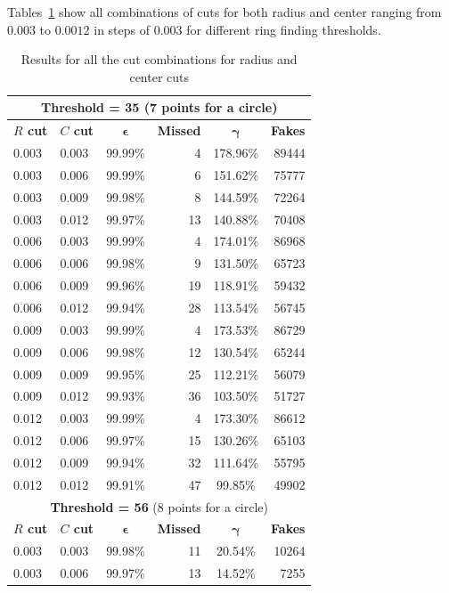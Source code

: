 \documentclass[11pt]{scrreprt}
\begin{document}
Tables~\ref{tab:longtable} show all combinations of cuts for both radius and center ranging from $0.003$ to
$0.0012$ in steps of $0.003$ for different ring finding thresholds. 
\newpage
\begin{longtable}{llcrcr}
\caption{Results for all the cut combinations for radius and center cuts}\label{tab:longtable}\\
\toprule
\multicolumn{6}{c}{\textbf{Threshold = 35} (7 points for a circle)}\\
\midrule
\textbf{$R$ cut} & \textbf{$C$ cut} & $\boldsymbol{\epsilon}$ & \textbf{Missed} & $\boldsymbol{\gamma}$ & \textbf{Fakes} \\
\midrule
0.003 & 0.003 & 99.99\% & 4 & 178.96\% & 89444 \\
0.003 & 0.006 & 99.99\% & 6 & 151.62\% & 75777 \\
0.003 & 0.009 & 99.98\% & 8 & 144.59\% & 72264 \\
0.003 & 0.012 & 99.97\% & 13 & 140.88\% & 70408 \\
0.006 & 0.003 & 99.99\% & 4 & 174.01\% & 86968 \\
0.006 & 0.006 & 99.98\% & 9 & 131.50\% & 65723 \\
0.006 & 0.009 & 99.96\% & 19 & 118.91\% & 59432 \\
0.006 & 0.012 & 99.94\% & 28 & 113.54\% & 56745 \\
0.009 & 0.003 & 99.99\% & 4 & 173.53\% & 86729 \\
0.009 & 0.006 & 99.98\% & 12 & 130.54\% & 65244 \\
0.009 & 0.009 & 99.95\% & 25 & 112.21\% & 56079 \\
0.009 & 0.012 & 99.93\% & 36 & 103.50\% & 51727 \\
0.012 & 0.003 & 99.99\% & 4 & 173.30\% & 86612 \\
0.012 & 0.006 & 99.97\% & 15 & 130.26\% & 65103 \\
0.012 & 0.009 & 99.94\% & 32 & 111.64\% & 55795 \\
0.012 & 0.012 & 99.91\% & 47 & 99.85\% & 49902 \\
\bottomrule
\toprule
\multicolumn{6}{c}{\textbf{Threshold = 56} (8 points for a circle)}\\
\midrule
\textbf{$R$ cut} & \textbf{$C$ cut} & $\boldsymbol{\epsilon}$ & \textbf{Missed} & $\boldsymbol{\gamma}$ & \textbf{Fakes} \\
\midrule
0.003 & 0.003 & 99.98\% & 11 & 20.54\% & 10264 \\
0.003 & 0.006 & 99.97\% & 13 & 14.52\% & 7255 \\

\end{longtable}
\end{document}
